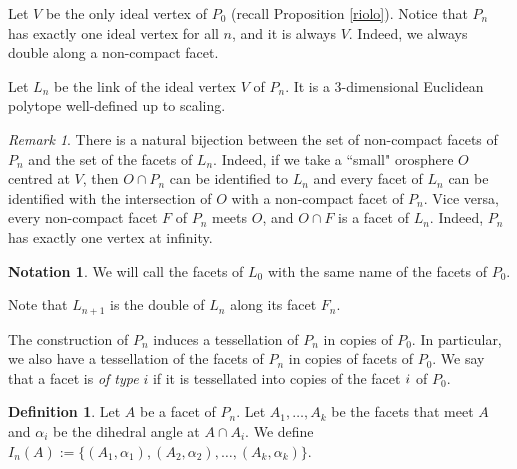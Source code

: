 \documentclass{amsart}
\theoremstyle{definition}
\newtheorem{defn}[lemma]{Definition}
\newtheorem{notat}[lemma]{Notation}
\theoremstyle{remark}
\newtheorem{rem}[lemma]{Remark}
\newcommand{\lk}{L}
\begin{document}
Let $V$ be the only ideal vertex of $P_0$ (recall Proposition \ref{riolo}). Notice that $P_n$ has exactly one ideal vertex for all $n$, and it is always $V$. Indeed, we always double along a non-compact facet.

Let $\lk_n$ be the link of the ideal vertex $V$ of $P_n$. It is a $3$-dimensional Euclidean polytope well-defined up to scaling.



\begin{rem}
    There is a natural bijection between the set of non-compact facets of $P_n$ and the set of the facets of $\lk_n$. Indeed, if we take a ``small" orosphere $O$ centred at $V$, then $O\cap P_n$ can be identified to $\lk_n$ and every facet of $\lk_n$ can be identified with the intersection of $O$ with a non-compact facet of $P_n$. Vice versa, every non-compact facet $F$ of $P_n$ meets $O$, and $O\cap F$ is a facet of $\lk_n$. Indeed, $P_n$ has exactly one vertex at infinity.
\end{rem}

\begin{notat}
We will call the facets of $\lk_0$ with the same name of the facets of $P_0$.%
\end{notat}




Note that $\lk_{n+1}$ is the double of $\lk_n$ along its facet $F_n$.

The construction of $P_n$ induces a tessellation of $P_n$ in copies of $P_0$. In particular, we also have a tessellation of the facets of $P_n$ in copies of facets of $P_0$. We say that a facet is \emph{of type} $i$ if it is tessellated into copies of the facet $\textit{\textbf{i}}$ of $P_0$.

\begin{defn}
    Let $A$ be a facet of $P_n$. Let $A_1,\dots,A_k$ be the facets that meet $A$ and $\alpha_i$ be the dihedral angle at $A\cap A_i$. We define $I_n(A):=\{(A_1,\alpha_1),(A_2,\alpha_2),\dots,(A_k,\alpha_k)\}$. %
    
\end{defn}
\end{document}

